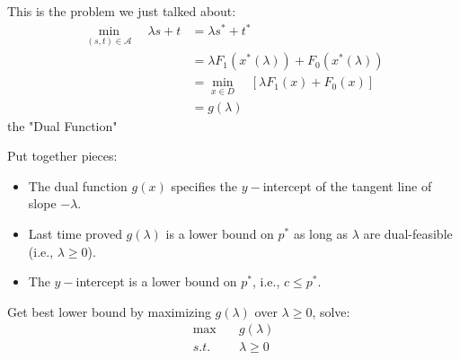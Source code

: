 This is the problem we just talked about:
\begin{align*}
	\min_{(s,t)\in \mathcal{A}} \quad \lambda s + t &= \lambda s^* + t^*\\
	&= \lambda F_1(x^*(\lambda)) + F_0(x^*(\lambda))\\
	&= \min_{x\in D} \quad[\lambda F_1(x) + F_0(x)]\\
	&= g(\lambda) 
\end{align*} the "Dual Function"

Put together pieces:






\begin{itemize}
	\item The dual function $g(x)$ specifies the $y-$intercept of the tangent line of slope $-\lambda$.
	
	\item Last time proved $g(\lambda)$ is a lower bound on $p^*$ as long as $\lambda$ are dual-feasible (i.e., $\lambda \geq 0$).
	
	\item The $y-$intercept is a lower bound on $p^*$, i.e., $c\leq p^{*}$.
\end{itemize}

Get best lower bound by maximizing $g(\lambda)$ over $\lambda \geq 0$, solve:
\begin{align*}
	\max \quad &g(\lambda)\\
	s.t. &\lambda \geq 0
\end{align*}








%
%
%



